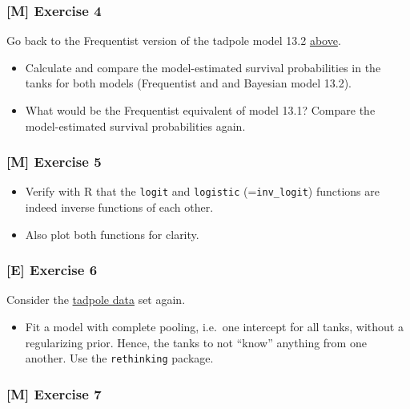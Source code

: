 \documentclass[
]{article}
\providecommand{\tightlist}{%
  \setlength{\itemsep}{0pt}\setlength{\parskip}{0pt}}
\begin{document}
\subsubsection{{[}M{]} Exercise 4}\label{exercise4_LMM}

Go back to the Frequentist version of the tadpole model 13.2
\hyperref[frequentist13_2]{above}.

\begin{itemize}
\tightlist
\item
  Calculate and compare the model-estimated survival probabilities in
  the tanks for both models (Frequentist and and Bayesian model 13.2).
\item
  What would be the Frequentist equivalent of model 13.1? Compare the
  model-estimated survival probabilities again.
\end{itemize}

\subsubsection{{[}M{]} Exercise 5}\label{exercise5_LMM}

\begin{itemize}
\tightlist
\item
  Verify with R that the \texttt{logit} and \texttt{logistic}
  (=\texttt{inv\_logit}) functions are indeed inverse functions of each
  other.
\item
  Also plot both functions for clarity.
\end{itemize}

\subsubsection{{[}E{]} Exercise 6}\label{exercise6_LMM}

Consider the \hyperref[tadpole]{tadpole data} set again.

\begin{itemize}
\tightlist
\item
  Fit a model with complete pooling, i.e.~one intercept for all tanks,
  without a regularizing prior. Hence, the tanks to not ``know''
  anything from one another. Use the \texttt{rethinking} package.
\end{itemize}

\subsubsection{{[}M{]} Exercise 7}\label{exercise7_LMM}
\end{document}
